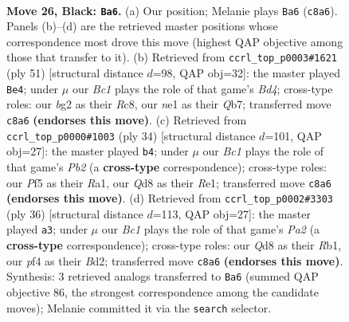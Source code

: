\documentclass[11pt]{article}
\begin{document}
\begin{figure}[p]
\label{fig:thought-m49}
\end{figure}

\clearpage

\begin{figure}[p]\centering
\begin{subfigure}{0.46\textwidth}\centering
\resizebox{\linewidth}{!}{%
\newchessgame
\chessboard[
  setfen={1rbq2k1/p1n2rn1/5bpp/2pp1p2/P1N2P2/1P4P1/Q3P1BP/1RBRN1K1 b - - 9 26},
  showmover=false,
  pgfstyle=straightmove, color=movearrow, markmove={c8-a6}
]}
\caption{}
\end{subfigure}\hfill
\begin{subfigure}{0.46\textwidth}\centering
\resizebox{\linewidth}{!}{%
\newchessgame
\chessboard[
  setfen={2r1k1r1/1q1n1p1p/pb2p3/3b2P1/p2B1P2/P3p3/1PP1N2P/1K1RQBR1 b - - 3 26},
  showmover=false,
  pgfstyle=straightmove, color=movearrow, markmove={d5-e4}
]}
\caption{}
\end{subfigure}
\\[4pt]
\begin{subfigure}{0.46\textwidth}\centering
\resizebox{\linewidth}{!}{%
\newchessgame
\chessboard[
  setfen={r3r1k1/1pqnbpp1/p1bpp2p/P7/4P3/2N1B2P/1PPQBPP1/R3R1K1 w - - 0 18},
  showmover=false,
  pgfstyle=straightmove, color=movearrow, markmove={b2-b4}
]}
\caption{}
\end{subfigure}\hfill
\begin{subfigure}{0.46\textwidth}\centering
\resizebox{\linewidth}{!}{%
\newchessgame
\chessboard[
  setfen={r3r1k1/2qbp1bp/1pn3p1/p1p2p2/2P2P2/3PQNP1/PP1B1RBP/1R4K1 w - - 0 19},
  showmover=false,
  pgfstyle=straightmove, color=movearrow, markmove={a2-a3}
]}
\caption{}
\end{subfigure}
\caption{\textbf{Move 26, Black: \texttt{Ba6}.} (a) Our position; Melanie plays \texttt{Ba6} (\texttt{c8a6}). Panels (b)--(d) are the retrieved master positions whose correspondence most drove this move (highest QAP objective among those that transfer to it). (b) Retrieved from \texttt{ccrl\_top\_p0003\#1621} (ply 51) [structural distance $d$=98, QAP obj=32]: the master played \texttt{Be4}; under $\mu$ our \emph{Bc1} plays the role of that game's \emph{Bd4}; cross-type roles: our \emph{b}g2 as their \emph{R}c8, our \emph{n}e1 as their \emph{Q}b7; transferred move \texttt{c8a6} \textbf{(endorses this move)}. (c) Retrieved from \texttt{ccrl\_top\_p0000\#1003} (ply 34) [structural distance $d$=101, QAP obj=27]: the master played \texttt{b4}; under $\mu$ our \emph{Bc1} plays the role of that game's \emph{Pb2} (a \textbf{cross-type} correspondence); cross-type roles: our \emph{P}f5 as their \emph{R}a1, our \emph{Q}d8 as their \emph{R}e1; transferred move \texttt{c8a6} \textbf{(endorses this move)}. (d) Retrieved from \texttt{ccrl\_top\_p0002\#3303} (ply 36) [structural distance $d$=113, QAP obj=27]: the master played \texttt{a3}; under $\mu$ our \emph{Bc1} plays the role of that game's \emph{Pa2} (a \textbf{cross-type} correspondence); cross-type roles: our \emph{Q}d8 as their \emph{R}b1, our \emph{p}f4 as their \emph{B}d2; transferred move \texttt{c8a6} \textbf{(endorses this move)}. Synthesis: 3 retrieved analogs transferred to \texttt{Ba6} (summed QAP objective 86, the strongest correspondence among the candidate moves); Melanie committed it via the \texttt{search} selector.}

\end{figure}
\end{document}
